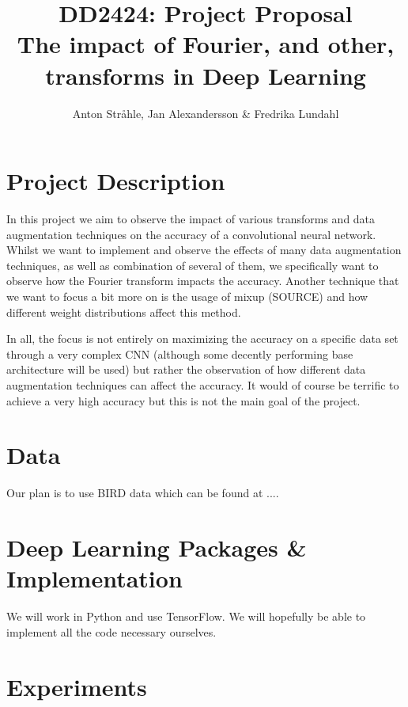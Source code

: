 \documentclass{article}
\begin{document}
\title{DD2424: Project Proposal \\
The impact of Fourier, and other, transforms in Deep Learning}
\author{Anton Stråhle, Jan Alexandersson \& Fredrika Lundahl}
\maketitle 

\section{Project Description}

In this project we aim to observe the impact of various transforms and data augmentation techniques on the accuracy of a convolutional neural network. Whilst we want to implement and observe the effects of many data augmentation techniques, as well as combination of several of them, we specifically want to observe how the Fourier transform impacts the accuracy. Another technique that we want to focus a bit more on is the usage of mixup (SOURCE) and how different weight distributions affect this method.

\medskip

In all, the focus is not entirely on maximizing the accuracy on a specific data set through a very complex CNN (although some decently performing base architecture will be used) but rather the observation of how different data augmentation techniques can affect the accuracy. It would of course be terrific to achieve a very high accuracy but this is not the main goal of the project.

\section{Data}

Our plan is to use BIRD data which can be found at ....

\section{Deep Learning Packages \& Implementation}

We will work in Python and use TensorFlow. We will hopefully be able to implement all the code necessary ourselves.

\section{Experiments}
\end{document}

